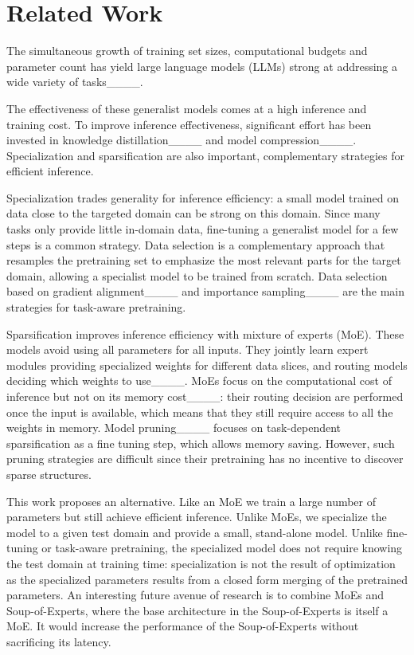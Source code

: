 \section{Related Work}
\label{sec:related}
The simultaneous growth of training set sizes, computational budgets and parameter count 
has yield large language models (LLMs) strong at addressing a wide variety of tasks____.

The effectiveness of these generalist models comes at a high inference and training cost.
To improve inference effectiveness, significant effort has been invested in knowledge distillation____ and model compression____.
Specialization and sparsification are also important, complementary strategies for efficient inference.

Specialization trades generality for inference efficiency: a small model trained on data close to the targeted domain can be strong on this domain. Since many tasks only provide little in-domain data, fine-tuning a generalist model for a few steps is a common strategy. Data selection is a complementary approach that resamples the pretraining set to emphasize the most relevant parts for the target domain, 
allowing a specialist model to be trained from scratch. Data selection based on gradient alignment____ and importance sampling____ are the main strategies for task-aware pretraining.

Sparsification improves inference efficiency with mixture of experts (MoE). These models avoid using all parameters for all inputs. They jointly learn expert modules providing specialized weights for different data slices, and routing models deciding which weights to use____. 
MoEs focus on the computational cost of inference but not on its memory cost____: their routing decision are performed once the input is available, which means that they still require access to all the weights in memory. Model pruning____ focuses on task-dependent sparsification as a fine tuning step, which allows memory saving. However, such pruning strategies are difficult since their pretraining has no incentive to discover sparse structures.

This work proposes an alternative. Like an MoE we train a large number of parameters but still achieve efficient inference.
Unlike MoEs, we specialize the model to a given test domain and provide a small, stand-alone model. Unlike fine-tuning or task-aware pretraining, 
the specialized model does not require knowing the test domain at training time: specialization is not the result of optimization as the 
specialized parameters results from a closed form merging of the pretrained parameters.
%
An interesting future avenue of research is to combine MoEs and Soup-of-Experts, where the base architecture in the Soup-of-Experts is itself a MoE. It would increase the performance of the Soup-of-Experts without sacrificing its latency.

